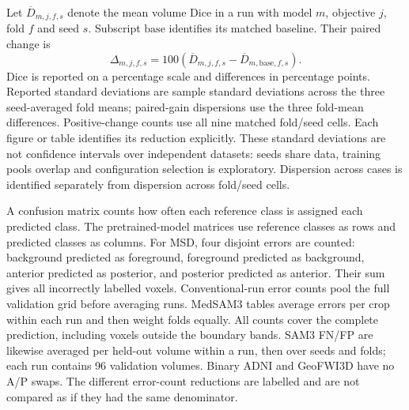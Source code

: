 Let $\overline D_{m,j,f,s}$ denote the mean volume Dice in a run with
model $m$, objective $j$, fold $f$ and seed $s$. Subscript
$\mathrm{base}$ identifies its matched baseline. Their paired change is
\begin{equation}
 \Delta_{m,j,f,s}=100\left(
 \overline D_{m,j,f,s}-\overline D_{m,\mathrm{base},f,s}\right).
\label{eq:paired-reported-gain}
\end{equation}
Dice is reported on a percentage scale and differences in percentage
points. Reported standard deviations are sample standard deviations across
the three seed-averaged fold means; paired-gain dispersions use the three
fold-mean differences. Positive-change counts use all nine matched
fold/seed cells. Each figure or table identifies its reduction explicitly.
These standard deviations are not confidence intervals over independent datasets: seeds share data,
training pools overlap and configuration selection is exploratory.
Dispersion across cases is identified separately from dispersion
across fold/seed cells.

A confusion matrix counts how often each reference class is assigned each
predicted class. The pretrained-model matrices use reference classes as rows
and predicted classes as columns. For MSD, four disjoint errors are counted:
background predicted as foreground, foreground predicted as background,
anterior predicted as posterior, and posterior predicted as anterior. Their
sum gives all incorrectly labelled voxels. Conventional-run error counts
pool the full validation grid before averaging runs. MedSAM3 tables average
errors per crop within each run and then weight folds equally. All counts
cover the complete prediction, including voxels outside the boundary bands.
SAM3 FN/FP are likewise averaged per held-out volume within a run, then over
seeds and folds; each run contains 96 validation volumes. Binary ADNI and
GeoFWI3D have no A/P swaps. The different error-count reductions are
labelled and are not compared as if they had the same denominator.

\clearpage

